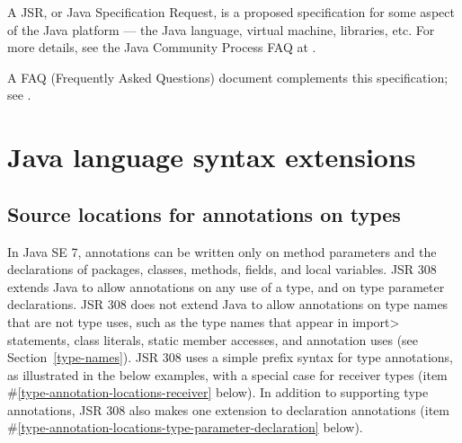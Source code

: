 \documentclass[10pt]{article}
\begin{document}
A JSR, or Java Specification Request, is a proposed specification for some
aspect of the Java platform --- the Java language, virtual machine,
libraries, etc.  For more details, see the Java Community Process FAQ at
.


A FAQ (Frequently Asked Questions) document complements this specification;
see .



\section{Java language syntax extensions\label{syntax}}

\newcommand{\preverbnegspace}{\vspace{-5pt}}

\subsection{Source locations for annotations on types\label{type-annotation-locations}}

In Java SE 7, annotations can be written only on method parameters
and the declarations of packages, classes, methods, fields, and local variables.
JSR 308 extends Java to allow annotations on any use of a type, and
on type parameter declarations.  JSR 308 does not extend Java to allow
annotations on type names that are not type uses, such as the type names
that appear in \<import> statements, class literals, static member accesses,
and annotation uses (see Section~\ref{type-names}).
JSR 308 uses a simple prefix syntax for type annotations, as illustrated in
the below examples, with a special case
for receiver types (item \#\ref{type-annotation-locations-receiver} below).
In addition to supporting type annotations, JSR 308 also makes one
extension to declaration annotations (item
\#\ref{type-annotation-locations-type-parameter-declaration} below).
\end{document}
